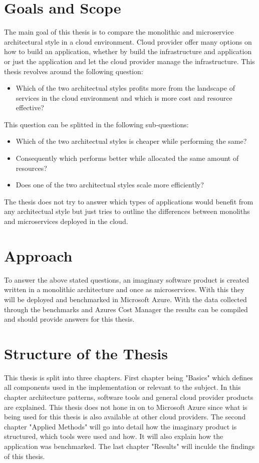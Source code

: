 \documentclass[MMR,Master,nenglish]{twbook}%
\begin{document}
\section{Goals and Scope}
The main goal of this thesis is to compare the monolithic and microservice architectural style in a cloud environment. Cloud provider offer many options on how to build an application, whether by build the infrastructure and application or just the application and let the cloud provider manage the infrastructure. This thesis revolves around the following question:

\begin{itemize}
  \item Which of the two architectual styles profits more from the landscape of services in the cloud environment and which is more cost and resource effective?
\end{itemize}

\noindent
This question can be splitted in the following sub-questions:

\begin{itemize}
  \item Which of the two architectual styles is cheaper while performing the same?
  \item Consequently which performs better while allocated the same amount of resources?
  \item Does one of the two architectual styles scale more efficiently?
\end{itemize}

The thesis does not try to answer which types of applications would benefit from any architectual style but just tries to outline the differences between monoliths and microservices deployed in the cloud.

\section{Approach}
To answer the above stated questions, an imaginary software product is created written in a monolithic architecture and once as microservices. With this they will be deployed and benchmarked in Microsoft Azure. With the data collected through the benchmarks and Azures Cost Manager the results can be compiled and should provide answers for this thesis.

\section{Structure of the Thesis}
This thesis is split into three chapters. First chapter being "Basics" which defines all components used in the implementation or relevant to the subject. In this chapter architecture patterns, software tools and general cloud provider products are explained. This thesis does not hone in on to Microsoft Azure since what is being used for this thesis is also available at other cloud providers. The second chapter "Applied Methods" will go into detail how the imaginary product is structured, which tools were used and how. It will also explain how the application was benchmarked. The last chapter "Results" will inculde the findings of this thesis.
\end{document}
